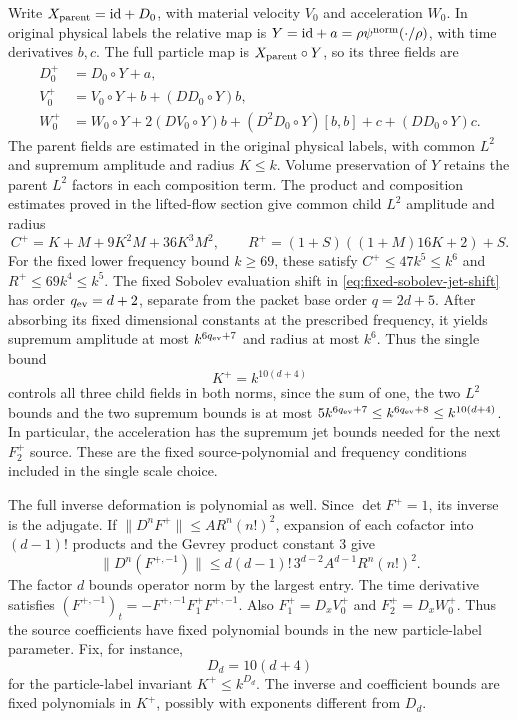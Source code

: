 \documentclass[11pt]{article}
\theoremstyle{definition}
\begin{document}
Write $X_{\rm parent}=\mathrm{id}+D_0$, with material velocity
$V_0$ and acceleration $W_0$. In original physical labels the relative
map is $Y=\mathrm{id}+a=\rho\psi^{\rm norm}(\cdot/\rho)$, with
time derivatives $b,c$. The full particle map is $X_{\rm parent}\circ Y$,
so its three fields are
\[
 \begin{split}
 D_0^+&=D_0\circ Y+a,\\
 V_0^+&=V_0\circ Y+b+(DD_0\circ Y)b,\\
 W_0^+&=W_0\circ Y+2(DV_0\circ Y)b+
        (D^2D_0\circ Y)[b,b]+c+(DD_0\circ Y)c.
 \end{split}
\]
The parent fields are estimated in the original physical labels, with
common $L^2$ and supremum amplitude and radius $K\leq k$. Volume
preservation of $Y$ retains the parent $L^2$ factors in each composition term. The product and composition
estimates proved in the lifted-flow section give common child
$L^2$ amplitude and radius
\[
 C^+=K+M+9K^2M+36K^3M^2,\qquad
 R^+=(1+S)((1+M)16K+2)+S.
\]
For the fixed lower frequency bound $k\geq69$, these satisfy
$C^+\leq47k^5\leq k^6$ and $R^+\leq69k^4\leq k^5$.
The fixed Sobolev evaluation shift in
\eqref{eq:fixed-sobolev-jet-shift} has order $q_{\rm ev}=d+2$,
separate from the packet base order $q=2d+5$. After absorbing its fixed
dimensional constants at the prescribed frequency, it yields
supremum amplitude at most $k^{6q_{\rm ev}+7}$ and radius at most
$k^6$. Thus the single bound
\[
 K^+=k^{10(d+4)}
\]
controls all three child fields in both norms, since the sum of one,
the two $L^2$ bounds and the two supremum bounds is at most
$5k^{6q_{\rm ev}+7}\leq k^{6q_{\rm ev}+8}\leq k^{10(d+4)}$.
In particular, the acceleration has the supremum jet bounds
needed for the next $F_2^+$ source. These are the fixed
source-polynomial and frequency conditions included in the single
scale choice.

The full inverse deformation is polynomial as well. Since
$\det F^+=1$, its inverse is the adjugate. If
$\|D^nF^+\|\leq A R^n(n!)^2$, expansion of each cofactor into
$(d-1)!$ products and the Gevrey product constant 3 give
\[
 \|D^n(F^{+,-1})\|
 \leq d(d-1)!\,3^{d-2}A^{d-1}R^n(n!)^2.
\]
The factor $d$ bounds operator norm by the largest entry.
The time derivative satisfies
$(F^{+,-1})_t=-F^{+,-1}F_1^+F^{+,-1}$.
Also $F_1^+=D_xV_0^+$ and $F_2^+=D_xW_0^+$.
Thus the source coefficients have fixed polynomial bounds in the
new particle-label parameter. Fix, for instance,
\[
 D_d=10(d+4)
\]
for the particle-label invariant $K^+\leq k^{D_d}$.
The inverse and coefficient bounds are fixed polynomials in $K^+$,
possibly with exponents different from $D_d$.
\end{document}
